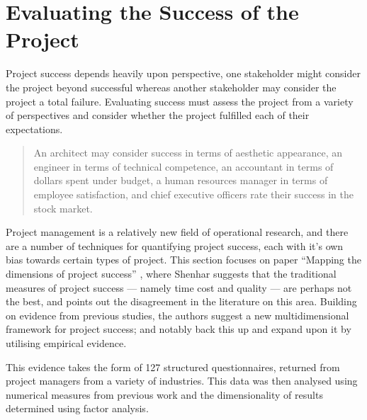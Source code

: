 \section[Evaluating the Success of the Project]{Evaluating the Success of the Project
}

Project success depends heavily upon perspective, one stakeholder might consider the project beyond successful whereas another stakeholder may consider the project a total failure. Evaluating success must assess the project from a variety of perspectives and consider whether the project fulfilled each of their expectations.

\begin{quote}
An architect may consider success in terms of aesthetic appearance, an engineer in terms of technical competence, an accountant in terms of dollars spent under budget, a human resources manager in terms of employee satisfaction, and chief executive officers rate their success in the stock market.

\end{quote}

Project management is a relatively new field of operational research, and there are a number of techniques for quantifying project success, each with it's own bias towards certain types of project. This section focuses on paper ``Mapping the dimensions of project success'' \cite{shenhar}, where Shenhar suggests that the traditional measures of project success --- namely time cost and quality --- are perhaps not the best, and points out the disagreement in the literature on this area. Building on evidence from previous studies, the authors suggest a new multidimensional framework for project success; and notably back this up and expand upon it by utilising empirical evidence.

This evidence takes the form of 127 structured questionnaires, returned from project managers from a variety of industries. This data was then analysed using numerical measures from previous work and the dimensionality of results determined using factor analysis.

